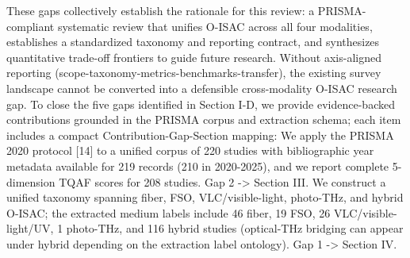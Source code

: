 {}These gaps collectively establish the rationale for this review: a PRISMA-compliant systematic review that unifies O-ISAC across all four modalities, establishes a standardized taxonomy and reporting contract, and synthesizes quantitative trade-off frontiers to guide future research.\markdownRendererInterblockSeparator
{}\markdownRendererBlockQuoteBegin
{} Without axis-aligned reporting (scope-taxonomy-metrics-benchmarks-transfer), the existing survey landscape cannot be converted into a defensible cross-modality O-ISAC research gap.\markdownRendererBlockQuoteEnd \markdownRendererInterblockSeparator
{}
\markdownRendererSectionEnd \markdownRendererSectionBegin
{}\markdownRendererInterblockSeparator
{}To close the five gaps identified in Section I-D, we provide evidence-backed contributions grounded in the PRISMA corpus and extraction schema; each item includes a compact Contribution-Gap-Section mapping:\markdownRendererInterblockSeparator
{}\markdownRendererOlBegin
{} We apply the PRISMA 2020 protocol [14] to a unified corpus of 220 studies with bibliographic year metadata available for 219 records (210 in 2020-2025), and we report complete 5-dimension TQAF scores for 208 studies.  Gap 2 -> Section III.\markdownRendererOlItemEnd 
{} We construct a unified taxonomy spanning fiber, FSO, VLC/visible-light, photo-THz, and hybrid O-ISAC; the extracted medium labels include 46 fiber, 19 FSO, 26 VLC/visible-light/UV, 1 photo-THz, and 116 hybrid studies (optical-THz bridging can appear under hybrid depending on the extraction label ontology).  Gap 1 -> Section IV.\markdownRendererOlItemEnd 
